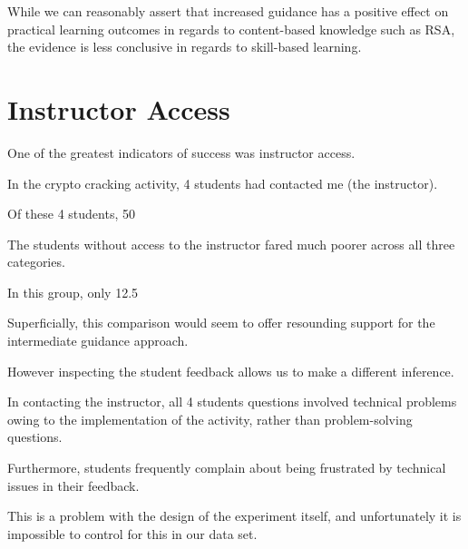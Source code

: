 While we can reasonably assert that increased guidance has a positive effect on practical learning outcomes in regards to content-based knowledge such as RSA, the evidence is less conclusive in regards to skill-based learning. 







        



    \section{Instructor Access}



        One of the greatest indicators of success was instructor access. %



In the crypto cracking activity, 4 students had contacted me (the instructor). %



Of these 4 students, 50\



        The students without access to the instructor fared much poorer across all three categories. %



In this group, only 12.5\



        Superficially, this comparison would seem to offer resounding support for the intermediate guidance approach. %



However inspecting the student feedback allows us to make a different inference. %



In contacting the instructor, all 4 students questions involved technical problems owing to the implementation of the activity, rather than problem-solving questions. %



Furthermore, students frequently complain about being frustrated by technical issues in their feedback. %



This is a problem with the design of the experiment itself, and unfortunately it is impossible to control for this in our data set. 







